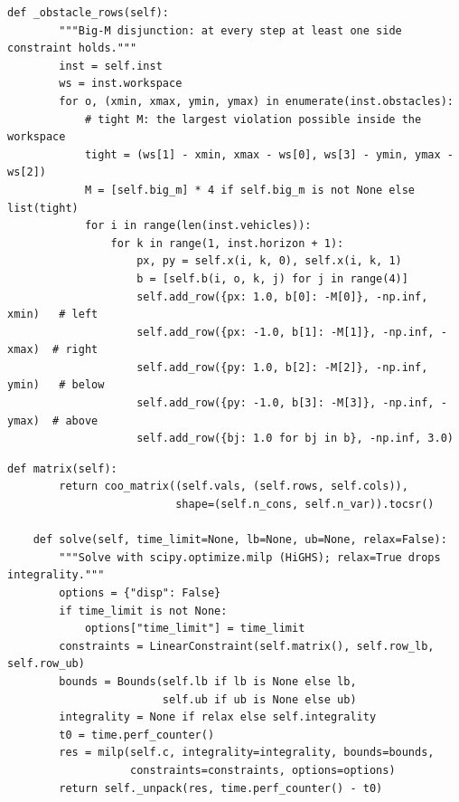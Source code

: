 \begin{lstlisting}[caption={The big-$M$ obstacle rows of \cref{eq:ch22-bigm} with the tight $M$ of \cref{eq:ch22-tightM} (from \code{code/ch22\_milp.py}).},label={lst:ch22-obstacle}]
    def _obstacle_rows(self):
        """Big-M disjunction: at every step at least one side constraint holds."""
        inst = self.inst
        ws = inst.workspace
        for o, (xmin, xmax, ymin, ymax) in enumerate(inst.obstacles):
            # tight M: the largest violation possible inside the workspace
            tight = (ws[1] - xmin, xmax - ws[0], ws[3] - ymin, ymax - ws[2])
            M = [self.big_m] * 4 if self.big_m is not None else list(tight)
            for i in range(len(inst.vehicles)):
                for k in range(1, inst.horizon + 1):
                    px, py = self.x(i, k, 0), self.x(i, k, 1)
                    b = [self.b(i, o, k, j) for j in range(4)]
                    self.add_row({px: 1.0, b[0]: -M[0]}, -np.inf, xmin)   # left
                    self.add_row({px: -1.0, b[1]: -M[1]}, -np.inf, -xmax)  # right
                    self.add_row({py: 1.0, b[2]: -M[2]}, -np.inf, ymin)   # below
                    self.add_row({py: -1.0, b[3]: -M[3]}, -np.inf, -ymax)  # above
                    self.add_row({bj: 1.0 for bj in b}, -np.inf, 3.0)
\end{lstlisting}

\begin{lstlisting}[caption={Assembling the sparse matrix and calling \code{scipy.optimize.milp} (from \code{code/ch22\_milp.py}).},label={lst:ch22-solve}]
    def matrix(self):
        return coo_matrix((self.vals, (self.rows, self.cols)),
                          shape=(self.n_cons, self.n_var)).tocsr()

    def solve(self, time_limit=None, lb=None, ub=None, relax=False):
        """Solve with scipy.optimize.milp (HiGHS); relax=True drops integrality."""
        options = {"disp": False}
        if time_limit is not None:
            options["time_limit"] = time_limit
        constraints = LinearConstraint(self.matrix(), self.row_lb, self.row_ub)
        bounds = Bounds(self.lb if lb is None else lb,
                        self.ub if ub is None else ub)
        integrality = None if relax else self.integrality
        t0 = time.perf_counter()
        res = milp(self.c, integrality=integrality, bounds=bounds,
                   constraints=constraints, options=options)
        return self._unpack(res, time.perf_counter() - t0)
\end{lstlisting}

